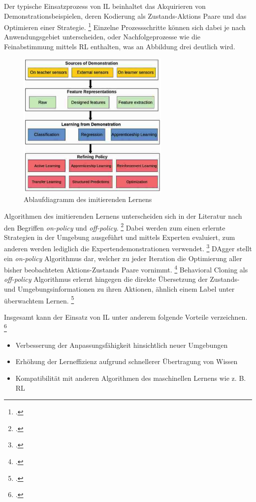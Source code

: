 Der typische Einsatzprozess von IL beinhaltet das Akquirieren von Demonstrationsbeispielen, deren Kodierung als Zustands-Aktions Paare und das Optimieren einer Strategie. \footcite[Vgl.][S. 3]{Hussein.2017}
Einzelne Prozessschritte können sich dabei je nach Anwendungsgebiet unterscheiden, oder Nachfolgeprozesse wie die Feinabstimmung mittels RL enthalten, was an Abbildung drei deutlich wird.
\begin{figure}[htb]
    \centering
    \includegraphics[height=7.2cm]{lib/graphics/IL flowchart.png}
    \caption[Ablaufdiagramm des imitierenden Lernens]{Ablaufdiagramm des imitierenden Lernens\footnotemark}
    \label{abb:IL-process-flowchart}
\end{figure}

Algorithmen des imitierenden Lernens unterscheiden sich in der Literatur nach den Begriffen \textit{on-policy} und \textit{off-policy}. \footcite[Vgl.][S. 3]{Ashwin.2020}
Dabei werden zum einen erlernte Strategien in der Umgebung ausgeführt und mittels Experten evaluiert, zum anderen werden lediglich die Expertendemonstrationen verwendet. \footcite[Vgl.][S. 3]{Ashwin.2020}
DAgger stellt ein \textit{on-policy} Algorithmus dar, welcher zu jeder Iteration die Optimierung aller bisher beobachteten Aktions-Zustands Paare vornimmt. \footcite[Vgl.][S. 5]{attia.2018}
Behavioral Cloning als \textit{off-policy} Algorithmus erlernt hingegen die direkte Übersetzung der Zustands- und Umgebungsinformationen zu ihren Aktionen, ähnlich einem Label unter überwachtem Lernen. \footcite[Vgl.][S. 4]{fang.2019}

Insgesamt kann der Einsatz von IL unter anderem folgende Vorteile verzeichnen. \footcite[Vgl.][S. 1]{fang.2019}
\begin{itemize}
    \item Verbesserung der Anpassungsfähigkeit hinsichtlich neuer Umgebungen
    \item Erhöhung der Lerneffizienz aufgrund schnellerer Übertragung von Wissen
    \item Kompatibilität mit anderen Algorithmen des maschinellen Lernens wie z. B. RL
\end{itemize}

